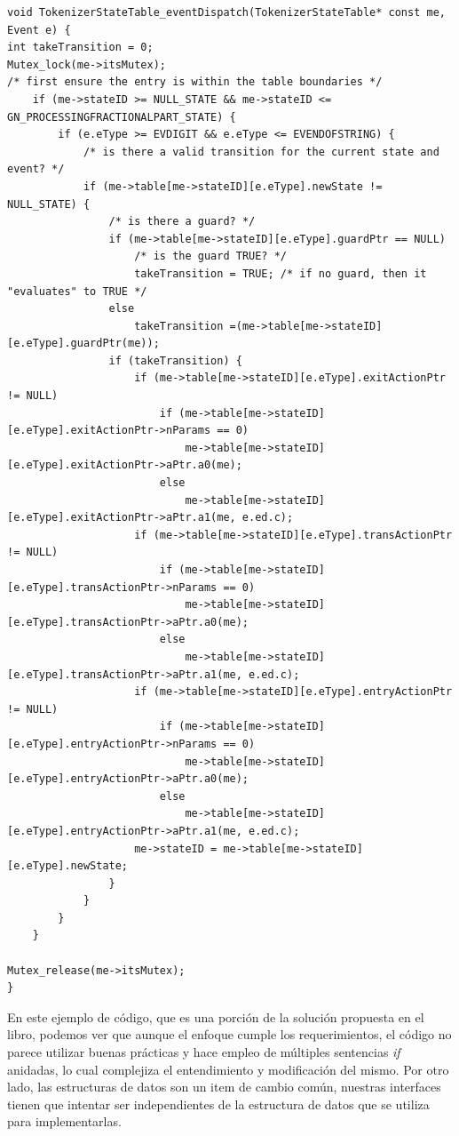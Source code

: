 \begin{lstlisting}[Codigo ejemplo Douglas State Table]
void TokenizerStateTable_eventDispatch(TokenizerStateTable* const me, Event e) {
int takeTransition = 0;
Mutex_lock(me->itsMutex);
/* first ensure the entry is within the table boundaries */
    if (me->stateID >= NULL_STATE && me->stateID <= GN_PROCESSINGFRACTIONALPART_STATE) {
        if (e.eType >= EVDIGIT && e.eType <= EVENDOFSTRING) {
            /* is there a valid transition for the current state and event? */
            if (me->table[me->stateID][e.eType].newState != NULL_STATE) {
                /* is there a guard? */
                if (me->table[me->stateID][e.eType].guardPtr == NULL)
                    /* is the guard TRUE? */
                    takeTransition = TRUE; /* if no guard, then it "evaluates" to TRUE */
                else
                    takeTransition =(me->table[me->stateID][e.eType].guardPtr(me));
                if (takeTransition) {
                    if (me->table[me->stateID][e.eType].exitActionPtr != NULL)
                        if (me->table[me->stateID][e.eType].exitActionPtr->nParams == 0)
                            me->table[me->stateID][e.eType].exitActionPtr->aPtr.a0(me);
                        else
                            me->table[me->stateID][e.eType].exitActionPtr->aPtr.a1(me, e.ed.c);
                    if (me->table[me->stateID][e.eType].transActionPtr != NULL)
                        if (me->table[me->stateID][e.eType].transActionPtr->nParams == 0)
                            me->table[me->stateID][e.eType].transActionPtr->aPtr.a0(me);
                        else
                            me->table[me->stateID][e.eType].transActionPtr->aPtr.a1(me, e.ed.c);
                    if (me->table[me->stateID][e.eType].entryActionPtr != NULL)
                        if (me->table[me->stateID][e.eType].entryActionPtr->nParams == 0)
                            me->table[me->stateID][e.eType].entryActionPtr->aPtr.a0(me);
                        else
                            me->table[me->stateID][e.eType].entryActionPtr->aPtr.a1(me, e.ed.c);
                    me->stateID = me->table[me->stateID][e.eType].newState;
                }
            }
        }
    }

Mutex_release(me->itsMutex);
}
\end{lstlisting}

En este ejemplo de código, que es una porción de la solución propuesta en el libro, podemos ver que aunque el enfoque cumple los requerimientos, el código no parece utilizar buenas prácticas y hace empleo de múltiples sentencias \textit{if} anidadas, lo cual complejiza el entendimiento y modificación del mismo. Por otro lado, las estructuras de datos son un item de cambio común, nuestras interfaces tienen que intentar ser independientes de la estructura de datos que se utiliza para implementarlas.

